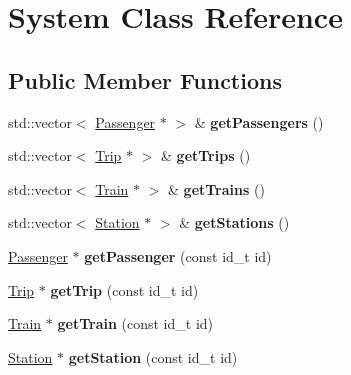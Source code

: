 \hypertarget{classSystem}{}\section{System Class Reference}
\label{classSystem}
\subsection*{Public Member Functions}
\begin{DoxyCompactItemize}
\item 
\mbox{\label{classSystem_aa4879a70a434d3b879090500b282de0b}} 
std\+::vector$<$ \mbox{\hyperlink{classPassenger}{Passenger}} $\ast$ $>$ \& {\bfseries get\+Passengers} ()
\item 
\mbox{\label{classSystem_a97b3ac8c8d84fecbdd2c49df5e4b51bf}} 
std\+::vector$<$ \mbox{\hyperlink{classTrip}{Trip}} $\ast$ $>$ \& {\bfseries get\+Trips} ()
\item 
\mbox{\label{classSystem_a44ee205bcb6c27bb1a7bc7fb545aef44}} 
std\+::vector$<$ \mbox{\hyperlink{classTrain}{Train}} $\ast$ $>$ \& {\bfseries get\+Trains} ()
\item 
\mbox{\label{classSystem_a6f27512fba42cc093efd34fe10bf0045}} 
std\+::vector$<$ \mbox{\hyperlink{classStation}{Station}} $\ast$ $>$ \& {\bfseries get\+Stations} ()
\item 
\mbox{\label{classSystem_a5a0348802d5cdb666f330b1e10d32727}} 
\mbox{\hyperlink{classPassenger}{Passenger}} $\ast$ {\bfseries get\+Passenger} (const id\+\_\+t id)
\item 
\mbox{\label{classSystem_a518ff04299c8b37d3cbec814ac0b7ec6}} 
\mbox{\hyperlink{classTrip}{Trip}} $\ast$ {\bfseries get\+Trip} (const id\+\_\+t id)
\item 
\mbox{\label{classSystem_ac29b91a9dca7dd1bb4c39769a75d444f}} 
\mbox{\hyperlink{classTrain}{Train}} $\ast$ {\bfseries get\+Train} (const id\+\_\+t id)
\item 
\mbox{\label{classSystem_aaadc55451a0d43b7ba98ff5377de8e02}} 
\mbox{\hyperlink{classStation}{Station}} $\ast$ {\bfseries get\+Station} (const id\+\_\+t id)

\end{DoxyCompactItemize}
